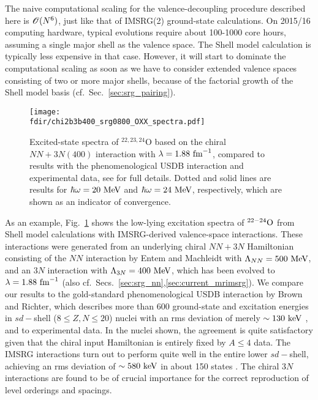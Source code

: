 {The naive computational scaling for the valence-decoupling procedure 
described here is $\OC(N^6)$, just like that of IMSRG(2) ground-state 
calculations. On 2015/16 computing hardware, typical evolutions require
about 100-1000 core hours, assuming a single major shell as the valence
space. The Shell model calculation is typically less expensive in that
case. However, it will start to dominate the computational scaling as 
soon as we have to consider extended valence spaces consisting of two
or more major shells, because of the factorial growth of 
the Shell model basis (cf.~Sec.~\ref{sec:srg_pairing}).

\begin{figure}[t]
  \begin{center}
    \texttt{[image: \\fdir/chi2b3b400\_srg0800\_OXX\_spectra.pdf]}
  \end{center}
\caption{Excited-state spectra of $^{22,23,24}$O based on the chiral
$NN+3N(400)$ interaction with $\lambdaSRG=1.88\,\fmi$, compared to 
results with the phenomenological USDB interaction \cite{Brown:2006fk}
and experimental data, see \cite{Bogner:2014tg,Hergert:2017kx} for 
full details. Dotted and solid lines are results for $\hbar \omega=20\,\MeV$
and $\hbar \omega=24\,\MeV$, respectively, which are shown as an indicator
of convergence. \label{fig:Ospectra}}
\end{figure}

As an example, Fig.~\ref{fig:Ospectra} shows the low-lying excitation 
spectra of $\nuc{O}{22-24}$ from Shell model calculations with IMSRG-derived
valence-space interactions. These interactions were generated from an 
underlying chiral $NN+3N$ Hamiltonian consisting of the
\NNNLO{} $NN$ interaction by Entem and Machleidt with $\Lambda_{NN}=500\,\MeV$,
and an \NNLO{} $3N$ interaction with $\Lambda_{3N}=400\,\MeV$, which has
been evolved to $\lambdaSRG=1.88\,\fmi$ \cite{Entem:2003th,Machleidt:2011bh,Gazit:2009qf,Roth:2011kx}
(also cf.~Secs.~\ref{sec:srg_nn},\ref{sec:current_mrimsrg}). We compare
our results to the gold-standard phenomenological USDB interaction by
Brown and Richter, which describes more than 600
ground-state and excitation energies in $sd-$shell ($8\leq Z,N\leq 20$) 
nuclei with an rms deviation of merely $\sim130\,\keV$ \cite{Brown:2006fk},
and to experimental data. In the nuclei shown, the agreement is quite
satisfactory given that the chiral input Hamiltonian is entirely fixed
by $A\leq4$ data. The IMSRG interactions turn out to perform quite well 
in the entire lower $sd-$shell, achieving an rms deviation of $\sim580\,\keV$
in about 150 states \cite{Stroberg:2016fk,Hergert:2017kx}. The chiral 
$3N$ interactions are found to be of crucial importance for the correct
reproduction of level orderings and spacings. 

}
